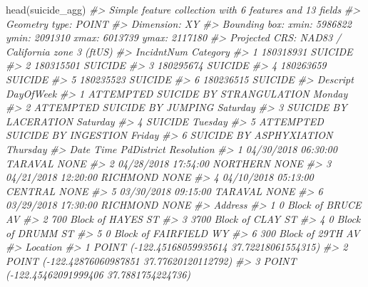 \documentclass[
  12pt,
  openany]{book}
\newenvironment{Shaded}{\begin{snugshade}}{\end{snugshade}}
\newcommand{\CommentTok}[1]{\textcolor[rgb]{0.37,0.37,0.37}{\textit{#1}}}
\newcommand{\FunctionTok}[1]{\textcolor[rgb]{0,0,0}{#1}}
\newcommand{\NormalTok}[1]{#1}
\begin{document}
\begin{Shaded}
\begin{Highlighting}[]
\FunctionTok{head}\NormalTok{(suicide\_agg)}
\CommentTok{\#\textgreater{} Simple feature collection with 6 features and 13 fields}
\CommentTok{\#\textgreater{} Geometry type: POINT}
\CommentTok{\#\textgreater{} Dimension:     XY}
\CommentTok{\#\textgreater{} Bounding box:  xmin: 5986822 ymin: 2091310 xmax: 6013739 ymax: 2117180}
\CommentTok{\#\textgreater{} Projected CRS: NAD83 / California zone 3 (ftUS)}
\CommentTok{\#\textgreater{}   IncidntNum Category}
\CommentTok{\#\textgreater{} 1  180318931  SUICIDE}
\CommentTok{\#\textgreater{} 2  180315501  SUICIDE}
\CommentTok{\#\textgreater{} 3  180295674  SUICIDE}
\CommentTok{\#\textgreater{} 4  180263659  SUICIDE}
\CommentTok{\#\textgreater{} 5  180235523  SUICIDE}
\CommentTok{\#\textgreater{} 6  180236515  SUICIDE}
\CommentTok{\#\textgreater{}                             Descript DayOfWeek}
\CommentTok{\#\textgreater{} 1 ATTEMPTED SUICIDE BY STRANGULATION    Monday}
\CommentTok{\#\textgreater{} 2       ATTEMPTED SUICIDE BY JUMPING  Saturday}
\CommentTok{\#\textgreater{} 3              SUICIDE BY LACERATION  Saturday}
\CommentTok{\#\textgreater{} 4                            SUICIDE   Tuesday}
\CommentTok{\#\textgreater{} 5     ATTEMPTED SUICIDE BY INGESTION    Friday}
\CommentTok{\#\textgreater{} 6            SUICIDE BY ASPHYXIATION  Thursday}
\CommentTok{\#\textgreater{}         Date     Time PdDistrict Resolution}
\CommentTok{\#\textgreater{} 1 04/30/2018 06:30:00    TARAVAL       NONE}
\CommentTok{\#\textgreater{} 2 04/28/2018 17:54:00   NORTHERN       NONE}
\CommentTok{\#\textgreater{} 3 04/21/2018 12:20:00   RICHMOND       NONE}
\CommentTok{\#\textgreater{} 4 04/10/2018 05:13:00    CENTRAL       NONE}
\CommentTok{\#\textgreater{} 5 03/30/2018 09:15:00    TARAVAL       NONE}
\CommentTok{\#\textgreater{} 6 03/29/2018 17:30:00   RICHMOND       NONE}
\CommentTok{\#\textgreater{}                   Address}
\CommentTok{\#\textgreater{} 1     0 Block of BRUCE AV}
\CommentTok{\#\textgreater{} 2   700 Block of HAYES ST}
\CommentTok{\#\textgreater{} 3   3700 Block of CLAY ST}
\CommentTok{\#\textgreater{} 4     0 Block of DRUMM ST}
\CommentTok{\#\textgreater{} 5 0 Block of FAIRFIELD WY}
\CommentTok{\#\textgreater{} 6    300 Block of 29TH AV}
\CommentTok{\#\textgreater{}                                         Location}
\CommentTok{\#\textgreater{} 1  POINT ({-}122.45168059935614 37.72218061554315)}
\CommentTok{\#\textgreater{} 2  POINT ({-}122.42876060987851 37.77620120112792)}
\CommentTok{\#\textgreater{} 3   POINT ({-}122.45462091999406 37.7881754224736)}

\end{Highlighting}
\end{Shaded}
\end{document}
